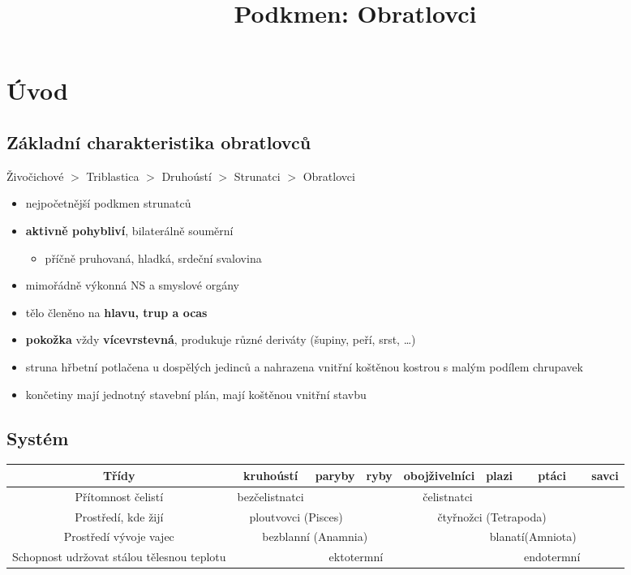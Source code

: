 \title{Podkmen: Obratlovci}


\section{Úvod}
\subsection{Základní charakteristika obratlovců}
Živočichové $>$ Triblastica $>$ Druhoústí $>$ Strunatci $>$ Obratlovci
\begin{itemize}
\item nejpočetnější podkmen strunatců
\item \textbf{aktivně pohybliví}, bilaterálně souměrní
	\begin{itemize}
	\item příčně pruhovaná, hladká, srdeční svalovina
	\end{itemize}
\item mimořádně výkonná NS a smyslové orgány
\item tělo členěno na \textbf{hlavu, trup a ocas}
\item \textbf{pokožka} vždy \textbf{vícevrstevná}, produkuje různé deriváty (šupiny, peří, srst, \ldots)
\item struna hřbetní potlačena u dospělých jedinců a nahrazena vnitřní koštěnou kostrou s malým podílem chrupavek
\item končetiny mají jednotný stavební plán, mají koštěnou vnitřní stavbu
\end{itemize}

\subsection{Systém}
\begin{tabular}{|c|c|c|c|c|c|c|c|}
\hline
Třídy&kruhoústí&paryby&ryby&obojživelníci&plazi&ptáci&savci		\\ \hline
Přítomnost čelistí&bezčelistnatci& \multicolumn{5}{c}{čelistnatci} &		\\ \hline
Prostředí, kde žijí & \multicolumn{2}{c}{ploutvovci (Pisces)} && \multicolumn{3}{c}{čtyřnožci (Tetrapoda)} &\\ \hline
Prostředí vývoje vajec & \multicolumn{3}{c}{bezblanní (Anamnia)} && \multicolumn{2}{c}{blanatí(Amniota)} &		\\ \hline
Schopnost udržovat stálou tělesnou teplotu	& \multicolumn{4}{c}{ektotermní} && \multicolumn{1}{c}{endotermní} &	\\ \hline
\end{tabular}

